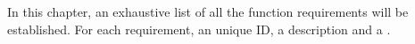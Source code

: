 
In this chapter, an exhaustive list of all the function requirements will be established. For each requirement, an unique ID, a description and a .
